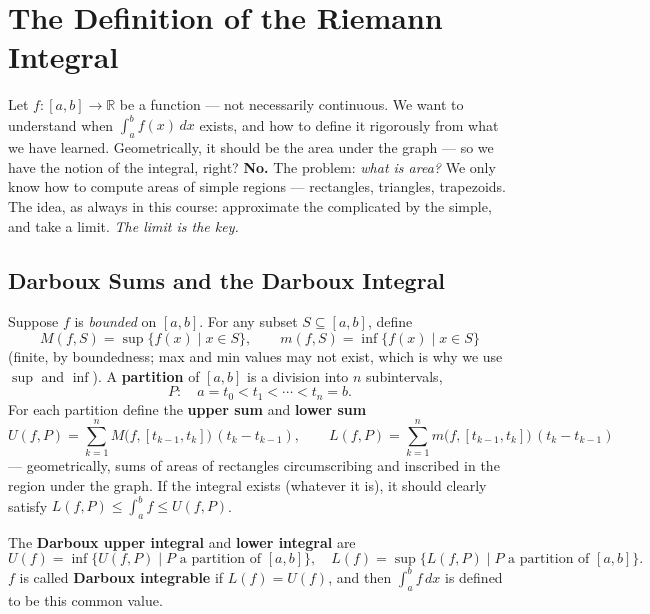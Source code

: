 \documentclass[11pt]{report}
\begin{document}

\section{The Definition of the Riemann Integral}

Let $f: [a,b] \to \mathbb{R}$ be a function --- not necessarily continuous. We want to understand when $\int_a^b f(x)\,dx$ exists, and how to define it rigorously from what we have learned. Geometrically, it should be the area under the graph --- so we have the notion of the integral, right? \textbf{No.} The problem: \emph{what is area?} We only know how to compute areas of simple regions --- rectangles, triangles, trapezoids. The idea, as always in this course: approximate the complicated by the simple, and take a limit. \emph{The limit is the key.}

\subsection{Darboux Sums and the Darboux Integral}

\begin{defbox}
Suppose $f$ is \emph{bounded} on $[a,b]$. For any subset $S \subseteq [a,b]$, define
\[
M(f, S) = \sup\{ f(x) \mid x \in S \}, \qquad m(f, S) = \inf\{ f(x) \mid x \in S \}
\]
(finite, by boundedness; max and min values may not exist, which is why we use $\sup$ and $\inf$). A \textbf{partition} of $[a,b]$ is a division into $n$ subintervals,
\[
P: \quad a = t_0 < t_1 < \cdots < t_n = b.
\]
For each partition define the \textbf{upper sum} and \textbf{lower sum}
\[
U(f, P) = \sum_{k=1}^n M\bigl(f, [t_{k-1}, t_k]\bigr)\,(t_k - t_{k-1}), \qquad
L(f, P) = \sum_{k=1}^n m\bigl(f, [t_{k-1}, t_k]\bigr)\,(t_k - t_{k-1})
\]
--- geometrically, sums of areas of rectangles circumscribing and inscribed in the region under the graph. If the integral exists (whatever it is), it should clearly satisfy $L(f,P) \leq \int_a^b f \leq U(f,P)$.
\end{defbox}

\begin{defbox}
The \textbf{Darboux upper integral} and \textbf{lower integral} are
\[
U(f) = \inf\{ U(f,P) \mid P \text{ a partition of } [a,b] \}, \quad
L(f) = \sup\{ L(f,P) \mid P \text{ a partition of } [a,b] \}.
\]
$f$ is called \textbf{Darboux integrable} if $L(f) = U(f)$, and then $\int_a^b f\,dx$ is defined to be this common value.
\end{defbox}
\end{document}
